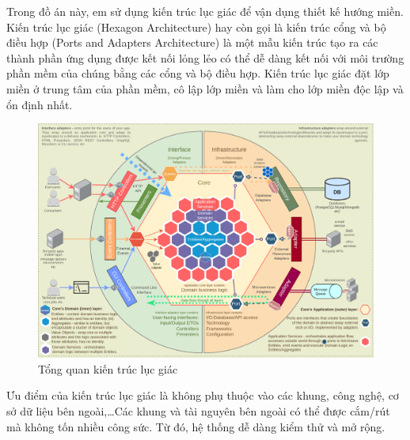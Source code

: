 Trong đồ án này, em sử dụng kiến trúc lục giác  để vận dụng  thiết kế hướng   miền. Kiến trúc   lục giác (Hexagon Architecture)  hay còn gọi là kiến trúc cổng và bộ điều hợp (Ports and Adapters Architecture) là một mẫu kiến trúc     tạo ra các thành phần ứng dụng được kết nối lỏng lẻo có thể dễ dàng kết nối với môi trường phần mềm của chúng bằng các cổng và bộ điều hợp. Kiến trúc   lục giác    đặt lớp miền ở trung tâm của phần mềm,  cô lập lớp miền và làm cho  lớp miền  độc lập và ổn định nhất. 



\begin{figure}[H]

\centering

\includegraphics[scale = 0.4]{pictures/_tong_quan_kien_truc_luc_giac/DomainDrivenHexagon.png}

\caption{Tổng quan kiến trúc lục giác}

\end{figure}


Ưu điểm của kiến trúc lục giác là không   phụ thuộc vào các khung, công nghệ, cơ sở dữ liệu bên ngoài,\dots Các khung và tài nguyên bên ngoài có thể được cắm/rút mà không tốn nhiều công sức. Từ đó, hệ thống dễ dàng kiểm thử và mở rộng.




